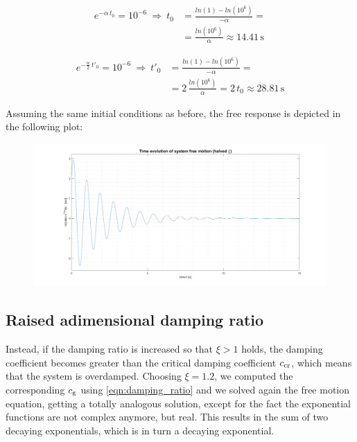 \documentclass[a4paper,12pt,oneside]{article}
\begin{document}
\[ \begin{split}
	e^{-\alpha \, t_0} = 10^{-6} ~ \Rightarrow ~
		t_0 & = \frac{ln(1) - ln(10^6)}{-\alpha} = \\
				& = \frac{ln(10^6)}{\alpha} \approx 14.41 \, \text{s}
\end{split} \]

\[ \begin{split}
	e^{-\frac{\alpha}{2} \, t'_0} = 10^{-6} ~ \Rightarrow ~
		t'_0 & = \frac{ln(1) - ln(10^6)}{-\alpha} = \\
				 & = 2 \, \frac{ln(10^6)}{\alpha} = 2 \, t_0 \approx 28.81 \, \text{s}
\end{split} \]

Assuming the same initial conditions as before, the free response is depicted in the following plot:

\clearpage

\begin{figure}[h]
	\hspace{-70pt}
	\includegraphics[scale=0.4]{free_time_response_halved_damping_ratio}
\end{figure}

\vspace{50pt}

\subsection{Raised adimensional damping ratio}

Instead, if the damping ratio is increased so that $ \xi > 1 $ holds, the damping coefficient becomes greater than the critical damping coefficient $ c_\textup{cr} $, which means that the system is overdamped. Choosing $ \xi = 1.2 $, we computed the corresponding $ c_\textup{g} $ using \eqref{eqn:damping_ratio} and we solved again the free motion equation, getting a totally analogous solution, except for the fact the exponential functions are not complex anymore, but real. This results in the sum of two decaying exponentials, which is in turn a decaying exponential.
\end{document}
